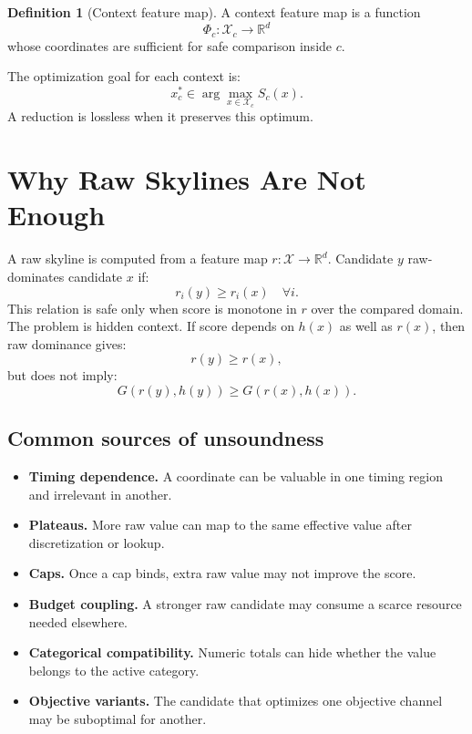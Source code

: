 \documentclass[11pt,oneside]{article}
\theoremstyle{definition}
\newtheorem{definition}{Definition}[section]
\newcommand{\cand}{\mathcal{X}}
\newcommand{\stats}{\Phi}
\newcommand{\score}{S}
\newcommand{\R}{\mathbb{R}}
\begin{document}
\begin{definition}[Context feature map]
A context feature map is a function
\[
  \stats_c : \cand_c \rightarrow \R^d
\]
whose coordinates are sufficient for safe comparison inside \(c\).
\end{definition}

The optimization goal for each context is:
\[
  x_c^* \in \arg\max_{x\in\cand_c} \score_c(x).
\]
A reduction is lossless when it preserves this optimum.

\section{Why Raw Skylines Are Not Enough}

A raw skyline is computed from a feature map \(r:\cand\rightarrow\R^d\). Candidate \(y\) raw-dominates candidate \(x\) if:
\[
  r_i(y) \ge r_i(x)\quad\forall i.
\]
This relation is safe only when score is monotone in \(r\) over the compared domain. The problem is hidden context. If score depends on \(h(x)\) as well as \(r(x)\), then raw dominance gives:
\[
  r(y)\ge r(x),
\]
but does not imply:
\[
  G(r(y),h(y))\ge G(r(x),h(x)).
\]

\subsection{Common sources of unsoundness}
\begin{itemize}
  \item \textbf{Timing dependence.} A coordinate can be valuable in one timing region and irrelevant in another.
  \item \textbf{Plateaus.} More raw value can map to the same effective value after discretization or lookup.
  \item \textbf{Caps.} Once a cap binds, extra raw value may not improve the score.
  \item \textbf{Budget coupling.} A stronger raw candidate may consume a scarce resource needed elsewhere.
  \item \textbf{Categorical compatibility.} Numeric totals can hide whether the value belongs to the active category.
  \item \textbf{Objective variants.} The candidate that optimizes one objective channel may be suboptimal for another.
\end{itemize}
\end{document}
